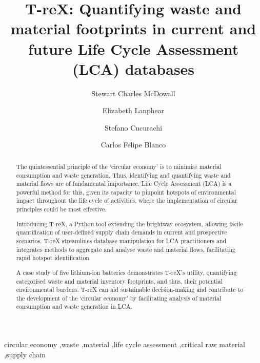 \documentclass[review,3p,authoryear]{elsarticle}
\newcommand{\cbox}[1]{
    \begin{tcolorbox}[hbox, colback=red!5!white, colframe=red!65!black, boxrule=0.25pt, boxsep=2pt, left=2pt, right=2pt, top=1pt, bottom=1pt]
        \small\sffamily #1
    \end{tcolorbox}
    }
\begin{document}
\begin{frontmatter}

    \title{T-reX: Quantifying waste and material footprints in current and future Life Cycle Assessment (LCA) databases}
    \author[1]{Stewart Charles McDowall}
    \author[1]{Elizabeth Lanphear}
    \author[1]{Stefano Cucurachi}
    \author[1]{Carlos Felipe Blanco}



    \begin{abstract}
        The quintessential principle of the `circular economy' is to minimise material consumption and waste generation.
        Thus, identifying and quantifying waste and material flows are of fundamental importance. Life Cycle Assessment (LCA) is a powerful method for this, given its capacity to pinpoint hotspots of environmental impact throughout the life cycle of activities, where the implementation of circular principles could be most effective.

        Introducing T-reX, a Python tool extending the brightway ecosystem, allowing facile quantification of user-defined supply chain demands in current and prospective scenarios. T-reX streamlines database manipulation for LCA practitioners and integrates methods to aggregate and analyse waste and material flows, facilitating rapid hotspot identification.

        A case study of five lithium-ion batteries demonstrates T-reX's utility, quantifying categorised waste and material inventory footprints, and thus, their potential environmental burdens. T-reX can aid sustainable decision-making and contribute to the development of the `circular economy' by facilitating analysis of material consumption and waste generation in LCA.

    \end{abstract}


    \begin{keyword}
        circular economy \sep{}waste \sep{}material \sep{}life cycle assessment \sep{}critical raw material \sep{}supply chain
    \end{keyword}

\end{frontmatter}
\end{document}
